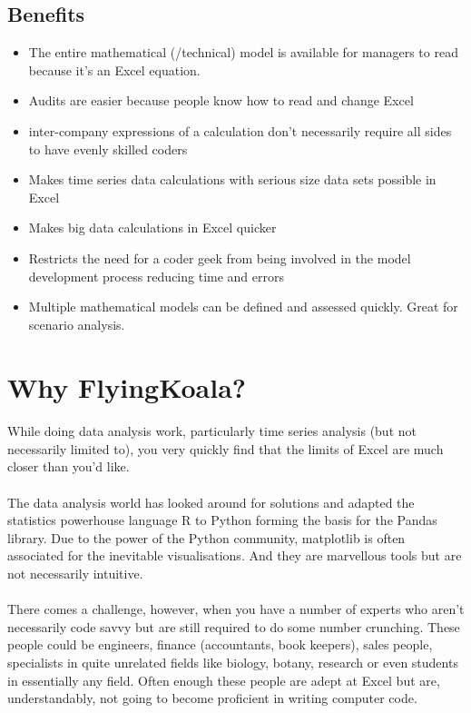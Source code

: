 \documentclass[12pt,a4paper,twoside,openright,titlepage]{article}
\begin{document}
\subsection{Benefits}
\begin{itemize}
	\item The entire mathematical (/technical) model is available for managers to read because it's an Excel equation. 
	\item Audits are easier because people know how to read and change Excel
	\item inter-company expressions of a calculation don't necessarily require all sides to have evenly skilled coders
	\item Makes time series data calculations with serious size data sets possible in Excel
	\item Makes big data calculations in Excel quicker
	\item Restricts the need for a coder geek from being involved in the model development process reducing time and errors
	\item Multiple mathematical models can be defined and assessed quickly. Great for scenario analysis.
\end{itemize}

\newpage
\section{Why FlyingKoala?}

\paragraph{} While doing data analysis work, particularly time series analysis (but not necessarily limited to), you very quickly find that the limits of Excel are much closer than you'd like.

\paragraph{} The data analysis world has looked around for solutions and adapted the statistics powerhouse language R to Python forming the basis for the Pandas library. Due to the power of the Python community, matplotlib is often associated for the inevitable visualisations. And they are marvellous tools but are not necessarily intuitive. 

\paragraph{} There comes a challenge, however, when you have a number of experts who aren't necessarily code savvy but are still required to do some number crunching. These people could be engineers, finance (accountants, book keepers), sales people, specialists in quite unrelated fields like biology, botany, research or even students in essentially any field. Often enough these people are adept at Excel but are, understandably, not going to become proficient in writing computer code.
\end{document}
